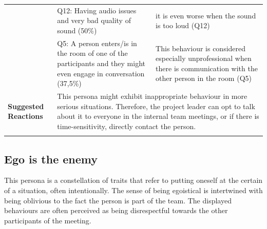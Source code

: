 \begin{longtable}[ht]{ p{}  p{} p{} }
 	 & Q12: Having audio issues and very bad quality of sound (50\%) & it is even worse when the sound is too loud (Q12)  \\
 	 & Q5: A person enters/is in the room of one of the participants and they might even engage in conversation (37,5\%) & This behaviour is considered especially unprofessional when there is communication with the other person in the room (Q5) \\
    \hline
    \textbf{Suggested Reactions} & \multicolumn{2}{p{.80\textwidth}}{This persona might exhibit inappropriate behaviour in more serious situations. Therefore, the project leader can opt to talk about it to everyone in the internal team meetings, or if there is time-sensitivity, directly contact the person.} \\
    \hline
\label{tab:multicol}
\end{longtable}

\subsection{Ego is the enemy}

This persona is a constellation of traits that refer to putting oneself at the certain of a situation, often intentionally. The sense of being egoistical is intertwined with being oblivious to the fact the person is part of the team. The displayed behaviours are often perceived as being disrespectful towards the other participants of the meeting. 

